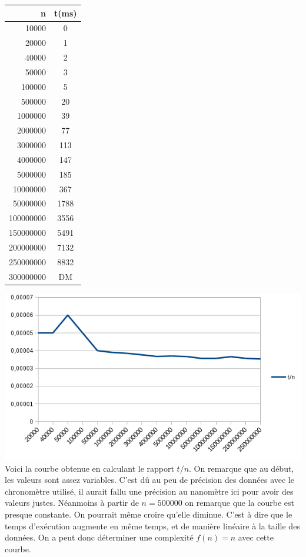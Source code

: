 \documentclass[a4paper, 12pt]{article}
\begin{document}
\begin{minipage}[c]{0.4\linewidth}
\begin{tabular}{|r|c|}
\hline
n & t(ms) \\
\hline
10000 &	0\\
20000 &	1\\
40000& 	2\\
50000 &	3\\
100000 &	5\\
500000	 & 20\\
1000000& 	39 \\
2000000&	77\\
3000000&	113\\
4000000&	147\\
5000000&	185\\
10000000&	367\\
50000000&	1788\\
100000000&	3556\\
150000000&	5491\\
200000000&	7132\\
250000000&	8832\\
300000000& DM\\
\hline
\end{tabular}
\end{minipage}\hfill
\begin{minipage}[c]{0.6\linewidth}
	\includegraphics[scale=0.6]{curve_algo_4.png}
	 	Voici la courbe obtenue en calculant le rapport $t/n$. 
		On remarque que au début, les valeurs sont assez variables. C'est dû au peu de précision des données avec le chronomètre utilisé, il aurait fallu une précision au nanomètre ici pour avoir des valeurs justes.
		Néanmoins à partir de $n=500 000$ on remarque que la courbe est presque constante. On pourrait même croire qu'elle diminue. C'est à dire que le temps d'exécution augmente en même temps, et de manière linéaire à la taille des données. On a peut donc déterminer une complexité $f(n) = n$ avec cette courbe. 
\end{minipage}
\end{document}
